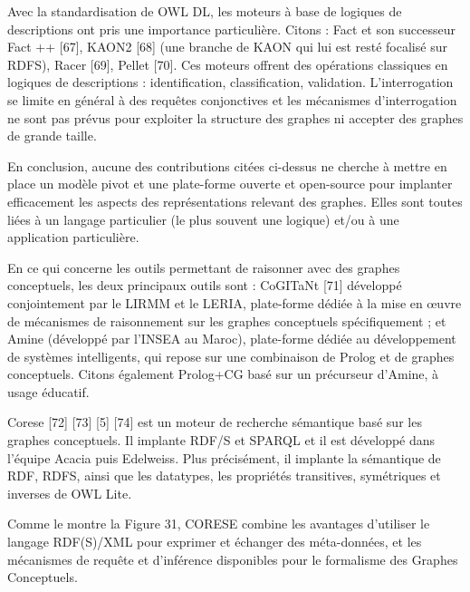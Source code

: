 Avec la standardisation de OWL DL, les moteurs à base de logiques de descriptions ont pris une importance particulière. Citons : Fact et son successeur Fact ++ [67], KAON2 [68] (une branche de KAON qui lui est resté focalisé sur RDFS), Racer [69], Pellet [70]. Ces moteurs offrent des opérations classiques en logiques de descriptions : identification, classification, validation. L’interrogation se limite en général à des requêtes conjonctives et les mécanismes d’interrogation ne sont pas prévus pour exploiter la structure des graphes ni accepter des graphes de grande taille.

En conclusion, aucune des contributions citées ci-dessus ne cherche à mettre en place un modèle pivot et une plate-forme ouverte et open-source pour implanter efficacement les aspects des représentations relevant des graphes. Elles sont toutes liées à un langage particulier (le plus souvent une logique) et/ou à une application particulière.

En ce qui concerne les outils permettant de raisonner avec des graphes conceptuels, les deux principaux outils sont : CoGITaNt [71] développé conjointement par le LIRMM et le LERIA, plate-forme dédiée à la mise en œuvre de mécanismes de raisonnement sur les graphes conceptuels spécifiquement ; et Amine (développé par l'INSEA au Maroc), plate-forme dédiée au développement de systèmes intelligents, qui repose sur une combinaison de Prolog et de graphes conceptuels. Citons également Prolog+CG basé sur un précurseur d'Amine, à usage éducatif.

Corese [72] [73] [5] [74] est un moteur de recherche sémantique basé sur les graphes conceptuels. Il implante RDF/S et SPARQL et il est développé dans l’équipe Acacia puis Edelweiss. Plus précisément, il implante la sémantique de RDF, RDFS, ainsi que les datatypes, les propriétés transitives, symétriques et inverses de OWL Lite.

Comme le montre la Figure 31, CORESE combine les avantages d'utiliser le langage RDF(S)/XML pour exprimer et échanger des méta-données, et les mécanismes de requête et d'inférence disponibles pour le formalisme des Graphes Conceptuels.

